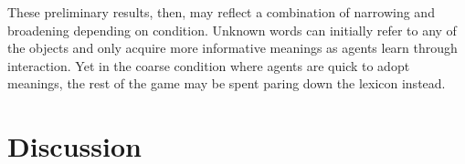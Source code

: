 These preliminary results, then, may reflect a combination of narrowing and broadening depending on condition. Unknown words can initially refer to any of the objects and only acquire more informative meanings as agents learn through interaction. Yet in the coarse condition where agents are quick to adopt meanings, the rest of the game may be spent paring down the lexicon instead.





\section{Discussion}

